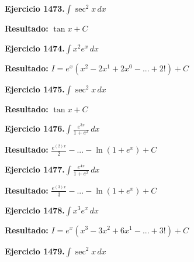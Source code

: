 \documentclass[10pt,a4paper]{article}
\begin{document}
\begin{ejbox}
\textbf{Ejercicio 1473.}\quad $\int \sec^2 x\,dx$
\end{ejbox}

\begin{solbox}
\textbf{Resultado:} \(\displaystyle \tan x + C\)
\end{solbox}

\newpage
\begin{ejbox}
\textbf{Ejercicio 1474.}\quad $\int x^{2} e^x\,dx$
\end{ejbox}

\begin{solbox}
\textbf{Resultado:} \(\displaystyle I = e^x(x^{2} - 2x^{1} + 2x^{0} - ... + 2!) + C\)
\end{solbox}

\begin{ejbox}
\textbf{Ejercicio 1475.}\quad $\int \sec^2 x\,dx$
\end{ejbox}

\begin{solbox}
\textbf{Resultado:} \(\displaystyle \tan x + C\)
\end{solbox}

\begin{ejbox}
\textbf{Ejercicio 1476.}\quad $\int \frac{e^{3x}}{1+e^{x}}\,dx$
\end{ejbox}

\begin{solbox}
\textbf{Resultado:} \(\displaystyle \frac{e^{(2)x}}{2} - ... - \ln(1+e^x) + C\)
\end{solbox}

\newpage
\begin{ejbox}
\textbf{Ejercicio 1477.}\quad $\int \frac{e^{4x}}{1+e^{x}}\,dx$
\end{ejbox}

\begin{solbox}
\textbf{Resultado:} \(\displaystyle \frac{e^{(3)x}}{3} - ... - \ln(1+e^x) + C\)
\end{solbox}

\begin{ejbox}
\textbf{Ejercicio 1478.}\quad $\int x^{3} e^x\,dx$
\end{ejbox}

\begin{solbox}
\textbf{Resultado:} \(\displaystyle I = e^x(x^{3} - 3x^{2} + 6x^{1} - ... + 3!) + C\)
\end{solbox}

\begin{ejbox}
\textbf{Ejercicio 1479.}\quad $\int \sec^2 x\,dx$
\end{ejbox}
\end{document}
